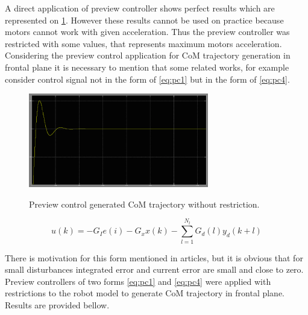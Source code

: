 \documentclass[12pt,a4paper]{report}
\begin{document}
		A direct application of preview controller shows perfect results which are represented on \cref{fig:25}. However these results cannot be used on practice because motors cannot work with given acceleration. Thus the preview controller was restricted with some values, that represents maximum motors acceleration.
		Considering the preview control application for CoM trajectory generation in frontal plane it is necessary to mention that some related works, for example \cite{choi2006fuzzy} consider control signal not in the form of \ref{eq:pc1} but in the form of \ref{eq:pc4}.
		
		\begin{figure}[h!]
			\vspace{-0.2cm}
			\centering
			{\includegraphics[width=0.7\textwidth]{25}}
			\caption{Preview control generated CoM trajectory without restriction.}
			\label{fig:25}
			\vspace{-0.1cm}
		\end{figure}
		
		\begin{equation}\label{eq:pc4}
			u(k) = -G_I e(i) - G_xx(k) - \sum^{N_l}_{l=1}G_d(l)y_d(k+l)
		\end{equation}
		
		 There is motivation for this form mentioned in articles, but it is obvious that for small disturbances integrated error and current error are small and close to zero. Preview controllers of two forms \ref{eq:pc1} and \ref{eq:pc4} were applied with restrictions to the robot model to generate CoM trajectory in frontal plane. Results are provided bellow.
		 
\end{document}

